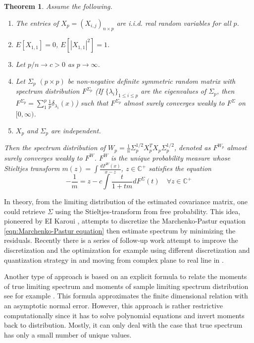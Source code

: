 \documentclass[12pt]{extarticle}
\newtheorem{theorem}{Theorem}
\newcommand{\1}{\field{1}}
\numberwithin{equation}{section}
\begin{document}
\begin{theorem}
	Assume the following. 
	\begin{enumerate}
		\item{} The entries of $X_p=(X_{i,j})_{n\times p}$ are 
			i.i.d. real random variables for all $p$. 
		
		\item{} $E[X_{1,1}]=0$, $E[|X_{1,1}|^2]=1$. 
		
		\item{} Let $p/n \to c >0$ as $p\to \infty$. 
		
		\item{} Let $\Sigma_p$ $(p\times p)$ be non-negative definite symmetric random matrix with spectrum distribution $F^{\Sigma_p}$ (If $\{\lambda_i\}_{1\le i \le p}$ are the eigenvalues of $\Sigma_p$, then $F^{\Sigma_p}=\sum_{1}^{p} \frac{1}{p} \delta_{\lambda_i}(x)$)  such that $F^{\Sigma_p}$ almost surely converges weakly to $F^{\Sigma}$ on $[0, \infty)$. 
		
		\item{} $X_p$ and ${\Sigma}_p$ are independent.
	\end{enumerate}
	Then the spectrum distribution of $W_p= \frac{1}{n}{\Sigma}_p^{1/2}X_p^T X_p {\Sigma}_p^{1/2}$, denoted as $F^{W_p}$  almost surely converges weakly to $F^W$. $F^W$ is the unique probability measure whose Stieltjes transform $m(z)= \int \frac{d F^W(x)}{x-z}$, $z\in \mathbb{C}^+$ satisfies the equation
	\begin{equation} \label{eqn:Marchenko-Pastur equation}
	-\frac{1}{m}=z- c\int \frac{t }{1+tm} d F^{\Sigma}(t) \quad \forall z \in \mathbb{C}^+
	\end{equation}
	
\end{theorem}


In theory, from the limiting distribution of the estimated covariance matrix, one could retrieve $\Sigma$ using the Stieltjes-transform from free probability. This idea, pioneered by  EI Karoui \cite{elkaroui2008},  attempts to discretize the Marchenko-Pastur equation \ref{eqn:Marchenko-Pastur equation} then estimate spectrum by minimizing the residuals. Recently there is a series of follow-up work attempt to improve the discretization and the optimization for example using different discretization and quantization strategy in \cite{ledoit2015, ledoit2017numerical} and moving from complex plane to real line in \cite{li2013}. 

Another type of approach is based on an explicit formula to relate the moments of true limiting spectrum and moments of sample limiting spectrum distribution see for example \cite{bai2010estimation, Valiant}. This formula approximates the finite dimensional relation with an asymptotic normal error. However, this approach is rather restrictive computationally since it has to solve polynomial equations and invert moments back to distribution. Mostly, it can only deal with the case that true spectrum has only a small number of unique values.
\end{document}
